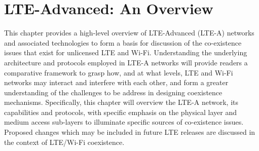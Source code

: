 %
%
%

\chapter{LTE-Advanced: An Overview}
\label{overview-lte} %


This chapter provides a high-level overview of LTE-Advanced (LTE-A) networks and associated technologies to form a basis for discussion of the co-existence issues that exist for unlicensed LTE and Wi-Fi. Understanding the underlying architecture and protocols employed in LTE-A networks will provide readers a comparative framework to grasp how, and at what levels, LTE and Wi-Fi networks may interact and interfere with each other, and form a greater understanding of the challenges to be address in designing coexistence mechanisms. Specifically, this chapter will overview the LTE-A network, its capabilities and protocols, with specific emphasis on the physical layer and medium access sub-layers to illuminate specific sources of co-existence issues. Proposed changes which may be included in future LTE releases are discussed in the context of LTE/Wi-Fi coexistence.


